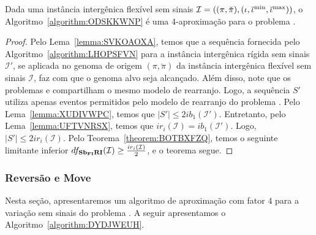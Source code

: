 \begin{theorem}\label{theorem:LXPAWAPW}
Dada uma instância intergênica flexível sem sinais $\mathcal{I} = ((\pi,\breve\pi),(\iota,\breve\iota^{\min},\break\breve\iota^{\max}))$, o Algoritmo~\ref{algorithm:ODSKKWNP} é uma $4$-aproximação para o problema \SbFIRI{}.
\end{theorem}
\begin{proof}
Pelo Lema~\ref{lemma:SVKOAOXA}, temos que a sequência fornecida pelo Algoritmo~\ref{algorithm:LHOPSFVN} para a instância intergênica rígida sem sinais $\mathcal{I'}$, se aplicada no genoma de origem $(\pi,\breve\pi)$ da instância intergênica flexível sem sinais $\mathcal{I}$, faz com que o genoma alvo seja alcançado. Além disso, note que os problemas \SbIRI{} e \SbFIRI{} compartilham o mesmo modelo de rearranjo. Logo, a sequência $S'$ utiliza apenas eventos permitidos pelo modelo de rearranjo do problema \SbFIRI{}. Pelo Lema~\ref{lemma:XUDIVWPC}, temos que $|S'| \le 2ib_1(\mathcal{I'})$. Entretanto, pelo Lema~\ref{lemma:UFTVNRSX}, temos que $ir_i(\mathcal{I}) = ib_1(\mathcal{I'})$. Logo, $|S'| \le 2ir_i(\mathcal{I})$. Pelo Teorema~\ref{theorem:BOTBXFZQ}, temos o seguinte limitante inferior $df_{\textbf{Sb\textsubscript{FI}RI}}(\mathcal{I}) \ge \frac{ir_i(\mathcal{I})}{2}$, e o teorema segue.
\end{proof}

\subsubsection{Reversão e Move}

Nesta seção, apresentaremos um algoritmo de aproximação com fator $4$ para a variação sem sinais do problema \SbFIRM{}. A seguir apresentamos o Algoritmo~\ref{algorithm:DYDJWEUH}.



